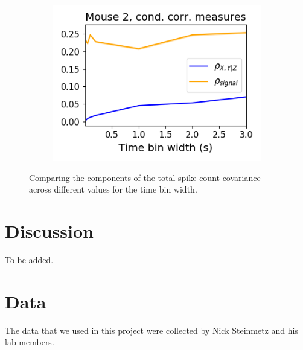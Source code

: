 \documentclass[a4paper,12pt]{article}
\theoremstyle{definition}
\begin{document}
\begin{figure}[h]
\begin{subfigure}[h]{0.5\linewidth}
      \includegraphics[width=\linewidth]{figures/Robbins_cond_corr_comparison.png}
      \label{fig:Robbins_cond_corr_comparison}
    \end{subfigure}
    \caption{Comparing the components of the total spike count covariance across different values for the time bin width. }
    \label{fig:conditional_correlation_comparison}
  \end{figure}


\section{Discussion}
To be added.

\section{Data}

    The data that we used in this project were collected by Nick Steinmetz and his lab members\cite{stringer}.
\end{document}
